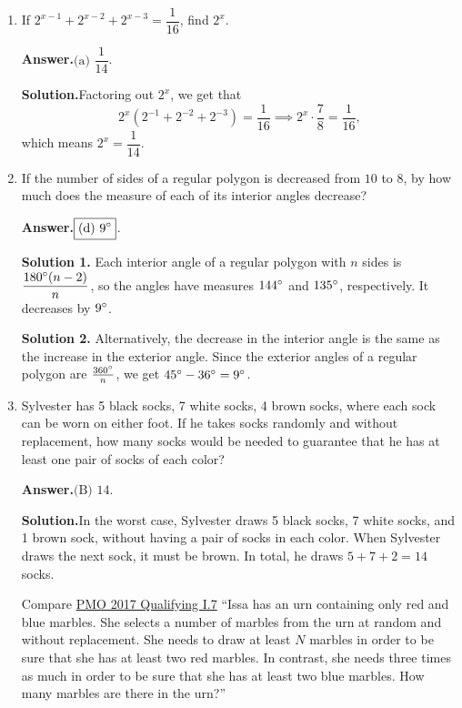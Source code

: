 \documentclass[11pt,paper=letter]{scrartcl}
\newcommand{\ans}{{\sffamily \bfseries Answer.}\;}
\newcommand{\sol}{{\sffamily \bfseries Solution.}\;}
\newcommand{\soln}[1]{{\sffamily \bfseries Solution #1.}\;}
\newcommand{\rem}[1]{{\small \sffamily \sansmath {\bfseries Remark.} #1}}
\begin{document}
\begin{enumerate}[align=left,leftmargin=*]

\item If $2^{x-1} + 2^{x-2} + 2^{x-3} = \dfrac{1}{16}$, find $2^x$.


\ans $\boxed{\text{(a) }\dfrac{1}{14}}$.

\sol Factoring out $2^x$, we get that
$$
2^x \left(2^{-1} + 2^{-2} + 2^{-3}\right) = \dfrac{1}{16} \implies 
2^x \cdot \frac{7}{8} = \dfrac{1}{16},$$
which means $2^x = \dfrac{1}{14}$.

\item If the number of sides of a regular polygon is decreased from $10$ to $8$, by how much does the measure of each of its interior angles decrease?

\fourch{$30\dg$}{$18\dg$}{$15\dg$}{$9\dg$}

\ans $\boxed{\text{(d) }9^\circ}$.

\soln1 Each interior angle of a regular polygon with $n$ sides is $\dfrac{180^\circ(n-2)}{n}$, so the angles have measures $144^\circ$ and $135^\circ$, respectively. It decreases by $9\dg$.

\soln2 Alternatively, the decrease in the interior angle is the same as the increase in the exterior angle. Since the exterior angles of a regular polygon are $\frac{360^\circ}{n}$, we get $45^\circ - 36^\circ = 9^\circ$.

\item Sylvester has 5 black socks, 7 white socks, 4 brown socks, where each sock can be worn on either foot. If he takes socks randomly and without replacement, how many socks would be needed to guarantee that he has at least one pair of socks of each color?


\ans $\boxed{\text{(B) }14}$.

\sol In the worst case, Sylvester draws 5 black socks, 7 white socks, and 1 brown sock, without having a pair of socks in each color. When Sylvester draws the next sock, it must be brown. In total, he draws $5 + 7 + 2 = 14$ socks.

\rem{Compare \href{http://pmo.ph/wp-content/uploads/2014/08/19th-PMO-Qualifying-Stage-Questions-and-Answers.pdf}{PMO 2017 Qualifying I.7} ``Issa has an urn containing only red and blue marbles. She selects a number of marbles from the urn at random and without replacement. She needs to draw at least $N$ marbles in order to be sure that she has at least two red marbles. In contrast, she needs three times as much in order to be sure that she has at least two blue marbles. How many marbles are there in the urn?''}


\end{enumerate}
\end{document}
